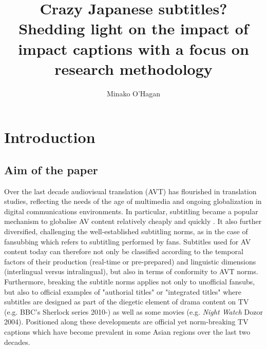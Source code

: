 \documentclass[output=paper]{langsci/langscibook}
\title{Crazy {Japanese} subtitles? {S}hedding light on the impact of impact captions with a focus on research methodology}
\author{Minako O'Hagan\affiliation{Dublin City University}
}
\begin{document}
 
\section{Introduction}

\subsection{Aim of the paper}

Over the last decade audiovisual translation (AVT) has flourished in translation studies, reflecting the needs of the age of multimedia and ongoing globalization in digital communications environments. In particular, subtitling became a popular mechanism to globalise AV content relatively cheaply and quickly \citep[p. 274]{diaz2013}. It also further diversified, challenging the well-established subtitling norms, as in the case of fansubbing which refers to subtitling performed by fans. Subtitles used for AV content today can therefore not only be classified according to the temporal factors of their production (real-time or pre-prepared) and linguistic dimensions (interlingual versus intralingual), but also in terms of conformity to AVT norms.   Furthermore, breaking the subtitle norms applies not only to unofficial fansubs, but also to official examples of "authorial titles" \citep{perezgonzalez2012} or "integrated titles" \citep{Fox2013} where subtitles are designed as part of the diegetic element of drama content on TV (e.g. BBC's Sherlock series 2010-) as well as some movies (e.g. \textit{Night Watch} Dozor 2004). Positioned along these developments are official yet norm-breaking TV captions which have become prevalent in some Asian regions over the last two decades.   
\end{document}
